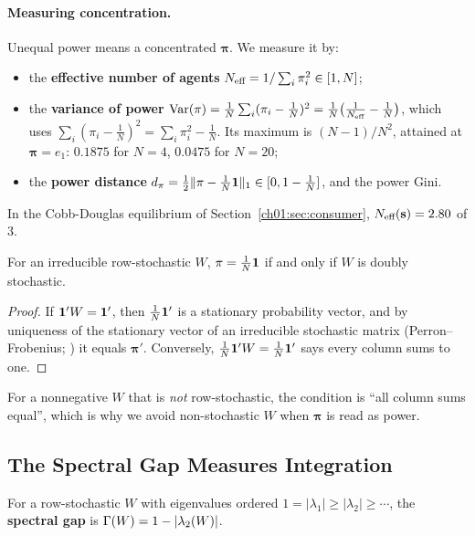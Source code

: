 \documentclass[../structural_economics_book.tex]{subfiles}
\begin{document}
\paragraph{Measuring concentration.} Unequal power means a concentrated $\boldsymbol{\pi}$. We measure it by:
\begin{itemize}
\item the \textbf{effective number of agents} $N_{\text{eff}} = 1/\sum_i \pi_i^2 \in [1, N]$;
\item the \textbf{variance of power} $\operatorname{Var}(\pi) = \frac{1}{N}\sum_i (\pi_i - \frac{1}{N})^2 = \frac{1}{N}\bigl(\frac{1}{N_{\text{eff}}} - \frac{1}{N}\bigr)$, which uses $\sum_i(\pi_i - \frac1N)^2 = \sum_i\pi_i^2 - \frac{1}{N}$. Its maximum is $(N-1)/N^2$, attained at $\boldsymbol{\pi} = e_1$: $0.1875$ for $N = 4$, $0.0475$ for $N = 20$;
\item the \textbf{power distance} $d_\pi = \frac{1}{2}\|\pi - \frac{1}{N}\mathbf{1}\|_1 \in [0, 1 - \frac1N]$, and the power Gini.
\end{itemize}
In the Cobb-Douglas equilibrium of Section~\ref{ch01:sec:consumer}, $N_{\text{eff}}(\mathbf{s}) = 2.80$ of $3$.

\begin{proposition}\label{ch01:prop:pi_uniform}
For an irreducible row-stochastic $W$, $\pi = \frac{1}{N}\mathbf{1}$ if and only if $W$ is doubly stochastic.
\end{proposition}
\begin{proof}
If $\mathbf{1}'W = \mathbf{1}'$, then $\frac{1}{N}\mathbf{1}'$ is a stationary probability vector, and by uniqueness of the stationary vector of an irreducible stochastic matrix (Perron--Frobenius; \citealt[Thm.~8.4.4]{horn2012matrix}) it equals $\boldsymbol{\pi}'$. Conversely, $\frac{1}{N}\mathbf{1}'W = \frac{1}{N}\mathbf{1}'$ says every column sums to one.
\end{proof}
For a nonnegative $W$ that is \textit{not} row-stochastic, the condition is ``all column sums equal'', which is why we avoid non-stochastic $W$ when $\boldsymbol{\pi}$ is read as power.

\subsection{The Spectral Gap Measures Integration}

\begin{definition}\label{ch01:def:gap}
For a row-stochastic $W$ with eigenvalues ordered $1 = |\lambda_1| \ge |\lambda_2| \ge \cdots$, the \textbf{spectral gap} is $\Gamma(W) = 1 - |\lambda_2(W)|$.
\end{definition}
\end{document}

